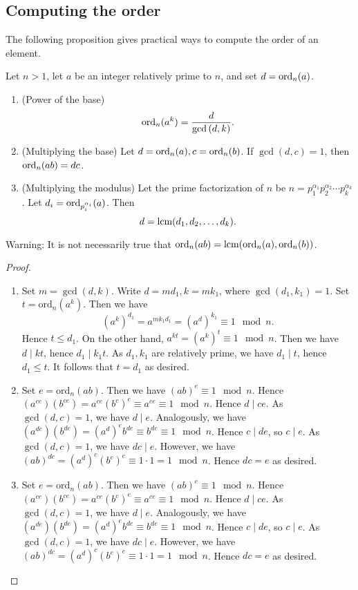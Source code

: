 \subsection{Computing the order}
The following proposition gives practical ways to compute the order of an element.
\begin{pr}
Let $n>1$, let $a$ be an integer relatively prime to $n$, and set $d = \operatorname{ord}_n(a)$.  \begin{enumerate}
\item (Power of the base) 
\[\operatorname{ord}_n(a^k) = \frac{d}{\gcd{(d,k)}}.\]
\item (Multiplying the base)
Let $d = \textup{ord}_n(a), c = \textup{ord}_n(b)$.  If $\gcd{(d,c)} = 1$, then $\textup{ord}_n(ab) = dc$.
\item (Multiplying the modulus)
Let the prime factorization of $n$ be $n = p_1^{\alpha_1}p_2^{\alpha_2}\cdots p_k^{\alpha_k}$.  Let $d_i = \textup{ord}_{p_i^{\alpha_i}}(a)$.  Then 
\[d = \textup{lcm}(d_1, d_2, \ldots, d_k).\]
\end{enumerate}
Warning: It is not necessarily true that $\operatorname{ord}_n(ab)=\operatorname{lcm}(\operatorname{ord}_n(a),\operatorname{ord}_n(b))$.
\begin{proof}
\begin{enumerate}
\item
Set $m = \gcd{(d,k)}$.  Write $d = md_1, k = mk_1$, where $\gcd{(d_1,k_1)} = 1$.  Set $t = \text{ord}_n(a^k)$.  Then we have $$(a^k)^{d_1} = a^{mk_1d_1} = (a^d)^{k_1} \equiv1\mod{n}.$$  Hence $t \le d_1$.  On the other hand, $a^{kt} = (a^k)^t \equiv 1\mod{n}$.  Then we have $d \mid kt$, hence $d_1 \mid k_1t$.  As $d_1, k_1$ are relatively prime, we have $d_1 \mid t$, hence $d_1 \le t$.  It follows that $t = d_1$ as desired.
\item
Set $e = \text{ord}_n(ab)$.  Then we have $(ab)^e\equiv1\mod{n}$.  Hence $(a^{ce})(b^{ce})= a^{ce}(b^c)^e\equiv a^{ce}\equiv1\mod{n}$.  Hence $d \mid ce$.  As $\gcd{(d,c)} = 1$, we have $d \mid e$.  Analogously, we have $(a^{de})(b^{de}) = (a^d)^eb^{de}\equiv b^{de}\equiv1\mod{n}$.  Hence $c \mid de$, so $c \mid e$.  As $\gcd{(d,c)} = 1$, we have $dc \mid e$.  However, we have $(ab)^{dc} = (a^d)^c(b^c)^e \equiv1\cdot1=1\mod{n}$.  Hence $dc = e$ as desired.
\item
Set $e = \text{ord}_n(ab)$.  Then we have $(ab)^e\equiv1\mod{n}$.  Hence $(a^{ce})(b^{ce})= a^{ce}(b^c)^e\equiv a^{ce}\equiv1\mod{n}$.  Hence $d \mid ce$.  As $\gcd{(d,c)} = 1$, we have $d \mid e$.  Analogously, we have $(a^{de})(b^{de}) = (a^d)^eb^{de}\equiv b^{de}\equiv1\mod{n}$.  Hence $c \mid de$, so $c \mid e$.  As $\gcd{(d,c)} = 1$, we have $dc \mid e$.  However, we have $(ab)^{dc} = (a^d)^c(b^c)^e \equiv1\cdot1=1\mod{n}$.  Hence $dc = e$ as desired.
\end{enumerate}
\end{proof}
\end{pr}
